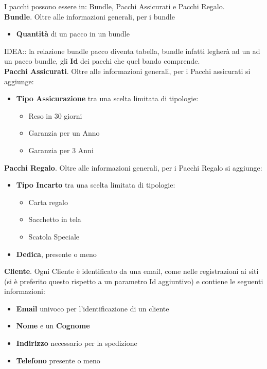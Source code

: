 I pacchi possono essere in: Bundle, Pacchi Assicurati e Pacchi Regalo.\\
\textbf{Bundle}. Oltre alle informazioni generali, per i bundle
\begin{itemize}
    \setlength{\itemindent}{+.5in}
        \item \textbf{Quantità} di un pacco in un bundle
\end{itemize}
IDEA:: la relazione bundle pacco diventa tabella, bundle infatti legherà ad un ad un pacco bundle, gli \textbf{Id} dei pacchi che quel bando comprende.\\
\textbf{Pacchi Assicurati}. Oltre alle informazioni generali, per i Pacchi assicurati si aggiunge:
\begin{itemize}
    \setlength{\itemindent}{+.5in}
    \item \textbf{Tipo Assicurazione} tra una scelta limitata di tipologie:
        \begin{itemize}
            \setlength{\itemindent}{+.5in}
            \item Reso in 30 giorni
            \item Garanzia per un Anno
            \item Garanzia per 3 Anni
        \end{itemize}
\end{itemize}

\textbf{Pacchi Regalo}. Oltre alle informazioni generali, per i Pacchi Regalo si aggiunge:
\begin{itemize}
    \setlength{\itemindent}{+.5in}
    \item \textbf{Tipo Incarto} tra una scelta limitata di tipologie:
        \begin{itemize}
            \setlength{\itemindent}{+.5in}
            \item Carta regalo
            \item Sacchetto in tela
            \item Scatola Speciale
        \end{itemize}
    \item \textbf{Dedica}, presente o meno
\end{itemize}

\textbf{Cliente}. Ogni Cliente è identificato da una email, come nelle registrazioni ai siti (si è preferito questo rispetto a un parametro Id aggiuntivo) e contiene le seguenti
informazioni:
\begin{itemize}
    \setlength{\itemindent}{+.5in}
    \item \textbf{Email} univoco per l'identificazione di un cliente
    \item \textbf{Nome} e un \textbf{Cognome}
    \item \textbf{Indirizzo} necessario per la spedizione
    \item \normalsize{\textbf{Telefono}} presente o meno
\end{itemize}

